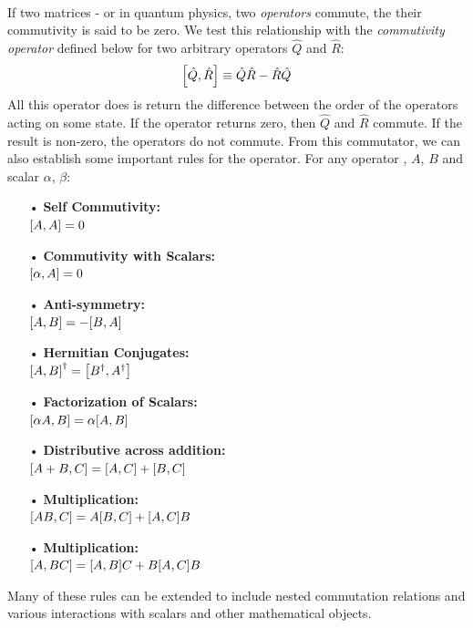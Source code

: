 \documentclass[12pt,letterpaper]{book}
\begin{document}
\paragraph*{}If two matrices - or in quantum physics, two \textit{operators} commute, the their commutivity is said to be zero. We test this relationship with the \textit{commutivity operator} defined below for two arbitrary operators $\hat{Q}$ and $\hat{R}$:
\begin{equation}
\label{commutator operator}
\comm{\hat{Q}}{\hat{R}} \equiv \hat{Q}\hat{R} - \hat{R}\hat{Q}
\end{equation}
All this operator does is return the difference between the order of the operators acting on some state. If the operator returns zero, then $\hat{Q}$ and $\hat{R}$ commute. If the result is non-zero, the operators do not commute. From this commutator, we can also establish some important rules for the operator. For any operator , $A$, $B$ and scalar $\alpha$, $\beta$:
\begin{multicols}{2}
\begin{itemize}
\item[•]\textbf{Self Commutivity:}\\
$ \comm{A}{A} = 0$
\item[•]\textbf{Commutivity with Scalars:}\\
$\comm{\alpha}{A} = 0$
\item[•]\textbf{Anti-symmetry:}\\
$ \comm{A}{B} = -\comm{B}{A} $
\item[•]\textbf{Hermitian Conjugates:}\\
$\comm{A}{B}^\dagger  = \comm{B^\dagger}{A^\dagger} $

\columnbreak

\item[•]\textbf{Factorization of Scalars:}\\
$\comm{\alpha A}{B} = \alpha \comm{A}{B}$
\item[•]\textbf{Distributive across addition:}\\
$\comm{A+B}{C} = \comm{A}{C} + \comm{B}{C}$
\item[•]\textbf{Multiplication:}\\
$\comm{AB}{C} = A\comm{B}{C} + \comm{A}{C}B$
\item[•]\textbf{Multiplication:}\\
$\comm{A}{BC} = \comm{A}{B}C + B\comm{A}{C}B$
\end{itemize}
\end{multicols}
Many of these rules can be extended to include nested commutation relations and various interactions with scalars and other mathematical objects.
\end{document}
